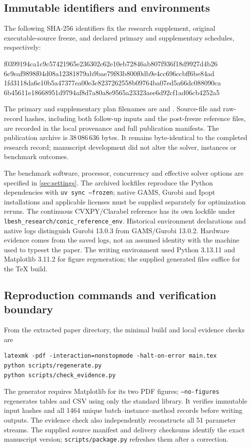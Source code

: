 \subsection{Immutable identifiers and environments}
The following SHA-256 identifiers fix the research supplement, original executable-source freeze, and declared primary and supplementary schedules, respectively:
\begin{center}\scriptsize\ttfamily
f0399194ca1c9c57421965e236302c62e10eb72846ab807f936f18d9927d4b26\\
6c9eaf9898f04d08a12381879ab9bae79f83b800f0db9e4cc696ccbff6be84ad\\
1fd3118da6e10b5a47377ea00e3c8237262558b09764ba07ed5a66dc088090ca\\
6b45611e18668951d9794af8d7a80a8e9565a23323aee6d92cf1ad06cb4252a5
\end{center}
The primary and supplementary plan filenames are  and . Source-file and raw-record hashes, including both follow-up inputs and the post-freeze reference files, are recorded in the local provenance and full publication manifests. The publication archive is 38\,086\,636 bytes. It remains byte-identical to the completed research record; manuscript development did not alter the solver, instances or benchmark outcomes.

The benchmark software, processor, concurrency and effective solver options are specified in \cref{sec:settings}. The archived lockfiles reproduce the Python dependencies with \texttt{uv sync --frozen}; native GAMS, Gurobi and Ipopt installations and applicable licenses must be supplied separately for optimization reruns. The continuous CVXPY/Clarabel reference has its own lockfile under \texttt{lbesh\_research/conic\_reference\_env}. Historical environment declarations and native logs distinguish Gurobi 13.0.3 from GAMS/Gurobi 13.0.2. Hardware evidence comes from the saved logs, not an assumed identity with the machine used to typeset the paper. The writing environment used Python 3.13.11 and Matplotlib 3.11.2 for figure regeneration; the supplied generated files suffice for the TeX build.

\subsection{Reproduction commands and verification boundary}
From the extracted paper directory, the minimal build and local evidence checks are
\begin{verbatim}
latexmk -pdf -interaction=nonstopmode -halt-on-error main.tex
python scripts/regenerate.py
python scripts/check_evidence.py
\end{verbatim}
The generator requires Matplotlib for its two PDF figures; \texttt{--no-figures} regenerates tables and CSV using only the standard library. It verifies immutable input hashes and all 1464 unique batch--instance--method records before writing outputs. The evidence check also independently reconstructs all 51 parameter streams. The supplied source manifest and delivery checksums identify the exact manuscript version; \texttt{scripts/package.py} refreshes them after a correction.

